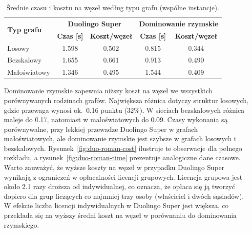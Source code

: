 \begin{table}[H]
  \centering
  \caption{Średnie czasu i kosztu na węzeł według typu grafu (wspólne instancje).}
  \label{tab:duo-roman-graph}
  \begin{tabular}{lcccc}
    \toprule
    \multirow{2}{*}{\textbf{Typ grafu}} & \multicolumn{2}{c}{\textbf{Duolingo Super}} & \multicolumn{2}{c}{\textbf{Dominowanie rzymskie}}                                            \\
                                        & \textbf{Czas [s]}                           & \textbf{Koszt/węzeł}                              & \textbf{Czas [s]} & \textbf{Koszt/węzeł} \\
    \midrule
    Losowy                              & 1.598                                       & 0.502                                             & 0.815             & 0.344                \\
    Bezskalowy                          & 1.655                                       & 0.661                                             & 0.913             & 0.490                \\
    Małoświatowy                        & 1.346                                       & 0.495                                             & 1.544             & 0.409                \\
    \bottomrule
  \end{tabular}
\end{table}

Dominowanie rzymskie zapewnia niższy koszt na węzeł we wszystkich porównywanych rodzinach grafów. Największa różnica dotyczy struktur losowych, gdzie przewaga wynosi ok.~0.16 punktu (32\%). W sieciach bezskalowych różnica maleje do 0.17, natomiast w małoświatowych do 0.09. Czasy wykonania są porównywalne, przy lekkiej przewadze Duolingo Super w grafach małoświatowych, ale dominowanie rzymskie jest szybsze w grafach losowych i bezskalowych. Rysunek~\ref{fig:duo-roman-cost} ilustruje te obserwacje dla pełnego rozkładu, a rysunek~\ref{fig:duo-roman-time} prezentuje analogiczne dane czasowe. Warto zauważyć, że wyższe koszty na węzeł w przypadku Duolingo Super wynikają z ograniczeń w opłacalności licencji grupowych. Licencja grupowa jest około 2.1 razy droższa od indywidualnej, co oznacza, że opłaca się ją tworzyć dopiero dla grup liczących co najmniej trzy osoby (właściciel i dwóch sąsiadów). W efekcie liczba licencji indywidualnych w Duolingo Super jest większa, co przekłada się na wyższy średni koszt na węzeł w porównaniu do dominowania rzymskiego.

